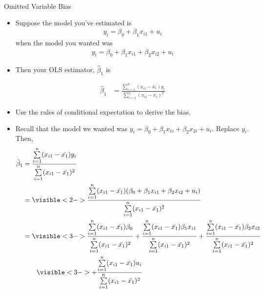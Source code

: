 \documentclass{beamer}
\newcommand{\0}{\mathbf{0}}
\begin{document}
\begin{frame}{Omitted Variable Bias}

\begin{itemize}

\item Suppose the model you've estimated is
\begin{align*}
y_{i}=\beta_{0}+\beta_{1}x_{i1}+u_{i}
\end{align*}
when the model you wanted was
\begin{align*}
y_{i}=\beta_{0}+\beta_{1}x_{i1}+\beta_{2}x_{i2}+u_{i}
\end{align*}

\end{itemize}
\end{frame}

\begin{frame}

\begin{itemize}
\item Then your OLS estimator, $\hat{\beta}_{1}$ is

{\small
\begin{align*}
\hat{\beta}_{1}&=\frac{\sum\limits_{i=1}^{n}(x_{i1}-\bar{x_{1}})y_{i}}{\sum\limits_{i=1}^{n}(x_{i1}-\bar{x_{1}})^{2}}
\end{align*}
}

\item Use the rules of conditional expectation to derive the bias.
\end{itemize}
\end{frame}
\begin{frame}
\begin{itemize}
\item Recall that the model we wanted was $y_i=\beta_{0}+\beta_{1}x_{1i}+\beta_{2}x_{2i}+u_i$. Replace $y_i$. Then,
{\small
\begin{align*}
\hat{\beta}_{1}&=\frac{\sum\limits_{i=1}^{n}(x_{i1}-\bar{x_{1}})y_{i}}{\sum\limits_{i=1}^{n}(x_{i1}-\bar{x_{1}})^{2}}\\
&= \visible<2->{\frac{\sum\limits_{i=1}^{n}(x_{i1}-\bar{x_{1}})(\beta_{0}+\beta_{1}x_{i1}+\beta_{2}x_{i2}+u_{i})}{\sum\limits_{i=1}^{n}(x_{i1}-\bar{x_{1}})^{2}}}\\
&=\visible<3->{\frac{\sum\limits_{i=1}^{n}(x_{i1}-\bar{x_{1}})\beta_{0}}{\sum\limits_{i=1}^{n}(x_{i1}-\bar{x_{1}})^{2}}+\frac{\sum\limits_{i=1}^{n}(x_{i1}-\bar{x_{1}})\beta_{1}x_{i1}}{\sum\limits_{i=1}^{n}(x_{i1}-\bar{x_{1}})^{2}}+\frac{\sum\limits_{i=1}^{n}(x_{i1}-\bar{x_{1}})\beta_{2}x_{i2}}{\sum\limits_{i=1}^{n}(x_{i1}-\bar{x_{1}})^{2}}}\\
&\quad\quad\visible<3->{+\frac{\sum\limits_{i=1}^{n}(x_{i1}-\bar{x_{1}})u_{i}}{\sum\limits_{i=1}^{n}(x_{i1}-\bar{x_{1}})^{2}}}
\end{align*}}
\end{itemize}
\end{frame}
\end{document}
